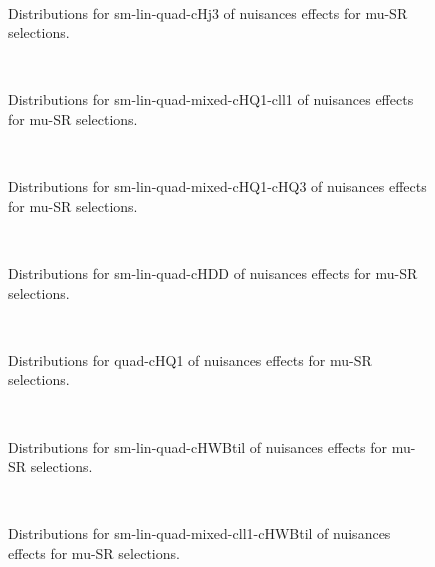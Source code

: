 


\begin{figure}[htbp]  
\centering 
\\ 
\caption{ 
   Distributions for sm-lin-quad-cHj3 of nuisances effects for mu-SR selections.
} 
\label{fig:sm_lin_quad_cHj3_mu_SR} 
\end{figure} 




\begin{figure}[htbp]  
\centering 
\\ 
\caption{ 
   Distributions for sm-lin-quad-mixed-cHQ1-cll1 of nuisances effects for mu-SR selections.
} 
\label{fig:sm_lin_quad_mixed_cHQ1_cll1_mu_SR} 
\end{figure} 




\begin{figure}[htbp]  
\centering 
\\ 
\caption{ 
   Distributions for sm-lin-quad-mixed-cHQ1-cHQ3 of nuisances effects for mu-SR selections.
} 
\label{fig:sm_lin_quad_mixed_cHQ1_cHQ3_mu_SR} 
\end{figure} 




\begin{figure}[htbp]  
\centering 
\\ 
\caption{ 
   Distributions for sm-lin-quad-cHDD of nuisances effects for mu-SR selections.
} 
\label{fig:sm_lin_quad_cHDD_mu_SR} 
\end{figure} 




\begin{figure}[htbp]  
\centering 
\\ 
\caption{ 
   Distributions for quad-cHQ1 of nuisances effects for mu-SR selections.
} 
\label{fig:quad_cHQ1_mu_SR} 
\end{figure} 




\begin{figure}[htbp]  
\centering 
\\ 
\caption{ 
   Distributions for sm-lin-quad-cHWBtil of nuisances effects for mu-SR selections.
} 
\label{fig:sm_lin_quad_cHWBtil_mu_SR} 
\end{figure} 




\begin{figure}[htbp]  
\centering 
\\ 
\caption{ 
   Distributions for sm-lin-quad-mixed-cll1-cHWBtil of nuisances effects for mu-SR selections.
} 
\label{fig:sm_lin_quad_mixed_cll1_cHWBtil_mu_SR} 
\end{figure} 




